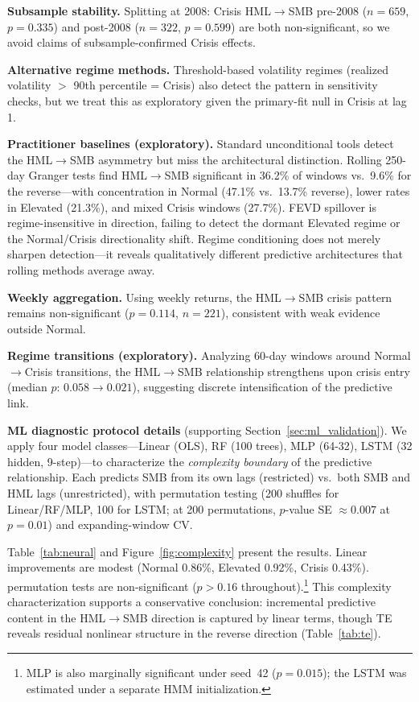 \documentclass[sigconf,anonymous]{acmart}
\begin{document}
\textbf{Subsample stability.} Splitting at 2008: Crisis HML$\to$SMB
pre-2008 ($n = 659$, $p = 0.335$) and post-2008 ($n = 322$, $p = 0.599$)
are both non-significant, so we avoid claims of subsample-confirmed Crisis effects.

\textbf{Alternative regime methods.} Threshold-based volatility regimes
(realized volatility $>$ 90th percentile = Crisis) also detect the pattern
in sensitivity checks, but we treat this as exploratory given the primary-fit
null in Crisis at lag 1.

\textbf{Practitioner baselines (exploratory).} Standard unconditional tools detect the HML$\to$SMB
asymmetry but miss the architectural distinction. Rolling 250-day Granger tests
find HML$\to$SMB significant in 36.2\% of windows vs.\ 9.6\% for the
reverse---with concentration in Normal (47.1\% vs.\ 13.7\% reverse),
lower rates in Elevated (21.3\%), and mixed Crisis windows (27.7\%).
FEVD spillover is regime-insensitive in direction,
failing to detect the dormant Elevated regime or the Normal/Crisis directionality
shift. Regime conditioning does not merely sharpen detection---it reveals
qualitatively different predictive architectures that rolling methods average away.

\textbf{Weekly aggregation.} Using weekly returns, the HML$\to$SMB crisis pattern
remains non-significant ($p = 0.114$, $n = 221$), consistent with weak
evidence outside Normal.

\textbf{Regime transitions (exploratory).} Analyzing 60-day windows around Normal$\to$Crisis
transitions, the HML$\to$SMB relationship strengthens upon crisis entry
(median $p$: $0.058 \to 0.021$), suggesting discrete intensification of the
predictive link.

\textbf{ML diagnostic protocol details} (supporting Section~\ref{sec:ml_validation}).
We apply four model classes---Linear (OLS), RF (100 trees), MLP (64-32),
LSTM (32 hidden, 9-step)---to characterize
the \emph{complexity boundary} of the predictive relationship.
Each predicts SMB from its own lags (restricted) vs.\ both SMB and
HML lags (unrestricted), with permutation testing
(200 shuffles for Linear/RF/MLP, 100 for LSTM; at 200 permutations,
$p$-value SE $\approx 0.007$ at $p = 0.01$) and expanding-window CV.

Table~\ref{tab:neural} and Figure~\ref{fig:complexity} present the results.
Linear improvements are modest (Normal 0.86\%, Elevated 0.92\%, Crisis 0.43\%).
permutation tests are non-significant ($p > 0.16$ throughout).\footnote{MLP is also marginally significant under seed~42 ($p = 0.015$); the LSTM was estimated under a separate HMM initialization.}
This complexity characterization supports a conservative conclusion:
incremental predictive content in the HML$\to$SMB direction is captured by
linear terms, though TE reveals residual nonlinear structure in the reverse
direction (Table~\ref{tab:te}).
\end{document}
